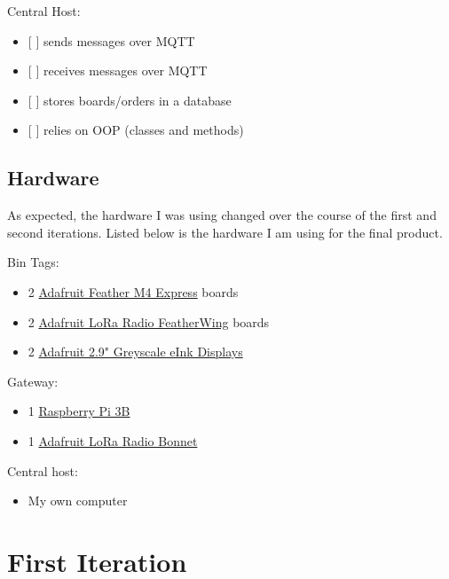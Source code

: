 \documentclass{article}
\begin{document}
\noindent
Central Host:

\begin{itemize}
\item
  {[} {]} sends messages over MQTT
\item
  {[} {]} receives messages over MQTT
\item
  {[} {]} stores boards/orders in a database
\item
  {[} {]} relies on OOP (classes and methods)
\end{itemize}

\subsection{Hardware}\label{hardware}

As expected, the hardware I was using changed over the course of the
first and second iterations. Listed below is the hardware I am using for
the final product.

\noindent
Bin Tags:

\begin{itemize}
\item
  2 \href{https://www.adafruit.com/product/3857}{Adafruit Feather M4
  Express} boards~
\item
  2 \href{https://www.adafruit.com/product/3231}{Adafruit LoRa Radio
  FeatherWing} boards~
\item
  2 \href{https://www.adafruit.com/product/4777}{Adafruit 2.9" Greyscale
  eInk Displays}~
\end{itemize}

\noindent
Gateway:

\begin{itemize}
\item
  1
  \href{https://www.raspberrypi.com/products/raspberry-pi-3-model-b/}{Raspberry
  Pi 3B}
\item
  1 \href{https://www.adafruit.com/product/4074}{Adafruit LoRa Radio
  Bonnet}
\end{itemize}

\noindent
Central host:

\begin{itemize}
\item
  My own computer
\end{itemize}

\section{First Iteration}\label{first-iteration}
\end{document}

